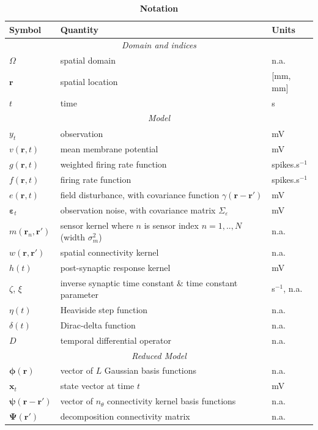 \documentclass[10pt]{article}
\begin{document}
\begin{table}[!ht]
\caption{
\bf{Notation}}
\begin{tabular}{|l|l|l|}
	\hline
	\textbf{Symbol} & \textbf{Quantity} & \textbf{Units}\\
	\hline
	\multicolumn{3}{|c|}{\emph{Domain and indices}}\\
	\hline
	$\Omega$ & spatial domain & n.a.\\
	$\mathbf{r}$ & spatial location & [mm, mm]\\
	$t$ & time & s\\
	\hline
	\multicolumn{3}{|c|}{\emph{Model}}\\
	\hline
    $y_t$ & observation & mV\\
    $v(\mathbf{r},t)$ & mean membrane potential & mV \\
	$g(\mathbf{r},t)$ & weighted firing rate function & spikes.s$^{-1}$\\
	$f(\mathbf{r},t)$ & firing rate function & spikes.s$^{-1}$\\
	$e(\mathbf{r},t)$ & field disturbance, with covariance function $\gamma(\mathbf r-\mathbf r')$ & mV\\
	$\boldsymbol\varepsilon_t$ & observation noise, with covariance matrix $\Sigma_\varepsilon$ & mV\\
	$m(\mathbf{r}_n,\mathbf{r}')$ & sensor kernel where $n$ is sensor index $n=1,..,N$ (width $\sigma_m^2$) & n.a. \\
	$w(\mathbf{r},\mathbf{r}')$ & spatial connectivity kernel & n.a.\\
	$h(t)$ & post-synaptic response kernel & mV\\
	$\zeta$, $\xi$ & inverse synaptic time constant \& time constant parameter & s$^{-1}$, n.a.\\
	$\eta(t)$ & Heaviside step function & n.a.\\
	$\delta(t)$ & Dirac-delta function & n.a.\\
	$D$ & temporal differential operator & n.a.\\
	\hline
	\multicolumn{3}{|c|}{\emph{Reduced Model}} \\
	\hline
   	$\boldsymbol\phi(\mathbf{r})$ & vector of $L$ Gaussian basis functions & n.a.\\
   	$\mathbf{x}_t$ & state vector at time $t$ & mV\\
   	$\boldsymbol{\psi}(\mathbf{r}-\mathbf{r}')$ & vector of $n_{\theta}$ connectivity kernel basis functions & n.a.\\
   	$\boldsymbol{\Psi}(\mathbf{r}')$ & decomposition connectivity matrix & n.a.\\

\end{tabular}
\end{table}
\end{document}
